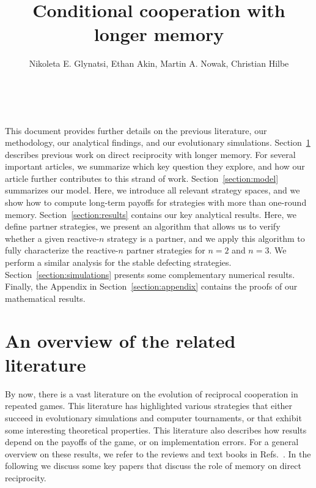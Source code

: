 \documentclass[9pt,twoside,lineno]{pnas-new}
\title{Conditional cooperation with longer memory}
\author{Nikoleta E. Glynatsi, Ethan Akin, Martin A. Nowak, Christian Hilbe}
\theoremstyle{plainCl1}
\theoremstyle{plainCl2}
\begin{document}
\maketitle


\tableofcontents
~\\[1cm]

\SItext



\noindent
This document provides further details on the previous literature, our methodology, our analytical
findings, and our evolutionary simulations.
Section~\ref{section:literature} describes previous work on direct reciprocity with longer memory. 
For several important articles, we summarize which key question they explore, and how our article further contributes to this strand of work. 
Section~\ref{section:model} summarizes our model. 
Here, we introduce all relevant strategy spaces, and we show how to compute long-term payoffs for strategies with more than one-round memory. 
Section~\ref{section:results} contains our key analytical results. 
Here, we define partner strategies, we present an algorithm that allows us to verify whether a given reactive-$n$ strategy is a partner, and we apply this algorithm to fully characterize the reactive-$n$ partner strategies for $n\!=\!2$ and $n\!=\!3$.
We perform a similar analysis for the stable defecting strategies. 
Section~\ref{section:simulations} presents some complementary numerical results. 
Finally, the Appendix in Section~\ref{section:appendix} contains the proofs of our mathematical results. 


\clearpage
\newpage



\section{An overview of the related literature}\label{section:literature}

By now, there is a vast literature on the evolution of reciprocal cooperation in repeated games. 
This literature has highlighted various strategies that either succeed in evolutionary simulations and computer tournaments, or that exhibit some interesting theoretical properties. 
This literature also describes how results depend on the payoffs of the game, or on implementation errors. 
For a general overview on these results, we refer to the reviews and text books in Refs.~\cite{axelrod:book:1984,nowak:book:2006,sigmund2010,hilbe:Nature:2018,Glynatsi:HSSC:2021}. 
In the following we discuss some key papers that discuss the role of memory on direct reciprocity.
\end{document}
